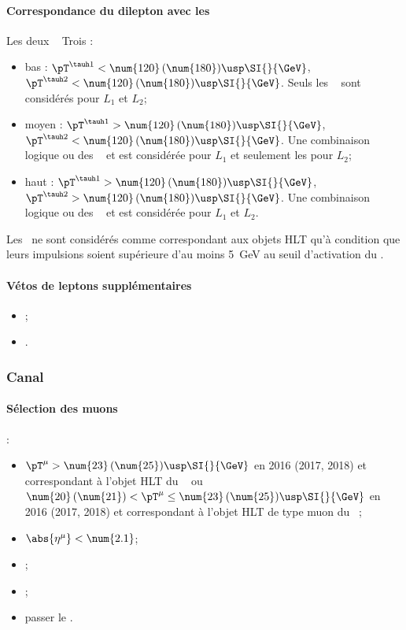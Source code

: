 \paragraph{Correspondance du dilepton avec les \HLTpaths}
Les deux \tauh\ \FromPairMatchToHLTObjects{}
Trois \HLTregionsDefined:
\begin{itemize}
    \item bas \pT: $\pT^{\tauh 1} < \num{120} \, (\num{180}) \usp \SI{}{\GeV}$, $\pT^{\tauh 2} < \num{120} \, (\num{180}) \usp \SI{}{\GeV}$.
        Seuls les \HLTpaths\ \HLTDoubleTau{} sont considérés pour $L_1$ et $L_2$;
    \item moyen \pT: $\pT^{\tauh 1} > \num{120} \, (\num{180}) \usp \SI{}{\GeV}$, $\pT^{\tauh 2} < \num{120} \, (\num{180}) \usp \SI{}{\GeV}$.
        Une combinaison logique \og ou \fg{} des \HLTpaths\ \HLTSingleTau{} et \HLTDoubleTau{} est considérée pour $L_1$ et seulement les \HLTDoubleTau{} pour $L_2$;
    \item haut \pT: $\pT^{\tauh 1} > \num{120} \, (\num{180}) \usp \SI{}{\GeV}$, $\pT^{\tauh 2} > \num{120} \, (\num{180}) \usp \SI{}{\GeV}$.
        Une combinaison logique \og ou \fg{} des \HLTpaths\ \HLTSingleTau{} et \HLTDoubleTau{} est considérée pour $L_1$ et $L_2$.
\end{itemize}
Les \tauh\ ne sont considérés comme correspondant aux objets HLT qu'à condition que leurs impulsions soient supérieure d'au moins \SI{5}{\GeV} au seuil d'activation du \HLTpath.
\paragraph{Vétos de leptons supplémentaires}
\LeptonVetoes
\begin{itemize}
    \item \LeptonVetoesExtraMuon;
    \item \LeptonVetoesExtraEle.
\end{itemize}

\subsubsection{Canal \mu\tauh}\label{chapter-HTT_analysis-section-offline-mt}
\paragraph{Sélection des muons}
:
\begin{itemize}
    \item $\pT^{\mu} > \num{23} \, (\num{25}) \usp \SI{}{\GeV}$ en 2016 (2017, 2018) et correspondant à l'objet HLT du \HLTpath\ \HLTSingleMu{} ou $\num{20} \, (\num{21}) < \pT^{\mu} \leq \num{23} \, (\num{25}) \usp \SI{}{\GeV}$ en 2016 (2017, 2018) et correspondant à l'objet HLT de type muon du \HLTpath\ \HLTMuTauCross{};
    \item $\abs{\eta^{\mu}} < \num{2.1}$;
    \item \Leptondzdxy;
    \item {};
    \item passer le \MediumMuonID.
\end{itemize}
